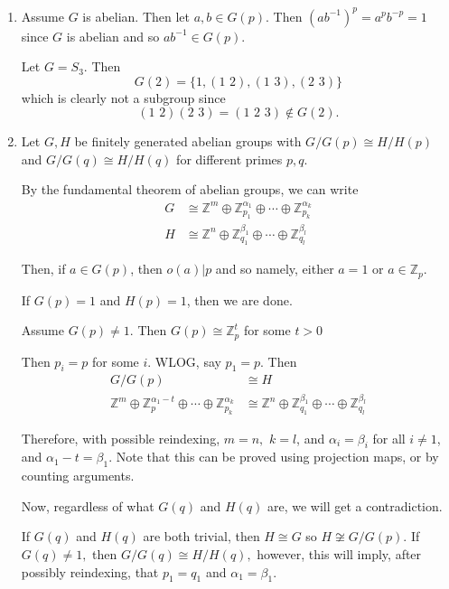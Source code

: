 \documentclass[12pt]{Qual}
\begin{document}
\begin{solution}$\,$
\begin{enumerate}[label=(\alph*)]
    \item Assume $G$ is abelian. Then let $a,b\in G(p)$. Then $(ab^{-1})^p=a^pb^{-p}=1$ since $G$ is abelian and so $ab^{-1}\in G(p).$

    Let $G=S_3$. Then $$G(2)=\{1,(1\,\, 2),(1\,\, 3),(2\,\,3)\}$$ which is clearly not a subgroup since $$(1\,\, 2)(2\,\,3)=(1\,\,2\,\,3)\notin G(2).$$
    \item Let $G,H$ be finitely generated abelian groups with $G/G(p)\cong H/H(p)$ and $G/G(q)\cong H/H(q)$ for different primes $p,q$.

    By the fundamental theorem of abelian groups, we can write \begin{align*}
        G&\cong\mathbb{Z}^m\oplus\mathbb{Z}_{p_1}^{\alpha_1}\oplus\cdots\oplus\mathbb{Z}_{p_k}^{\alpha_k}\\
        H&\cong\mathbb{Z}^n\oplus\mathbb{Z}_{q_1}^{\beta_1}\oplus\cdots\oplus\mathbb{Z}_{q_l}^{\beta_l}
    \end{align*}

    Then, if $a\in G(p)$, then $o(a)|p$ and so namely, either $a=1$ or $a\in\mathbb{Z}_p$.

    If $G(p)=1$ and $H(p)=1$, then we are done.

    Assume $G(p)\not=1.$ Then $G(p)\cong\mathbb{Z}_p^t$ for some $t>0$

     Then $p_i=p$ for some $i$. WLOG, say $p_1=p.$ Then \begin{align*}
        G/G(p)&\cong H\\
        \mathbb{Z}^m\oplus\mathbb{Z}_{p}^{\alpha_1-t}\oplus\cdots\oplus\mathbb{Z}_{p_k}^{\alpha_k}&\cong \mathbb{Z}^n\oplus\mathbb{Z}_{q_1}^{\beta_1}\oplus\cdots\oplus\mathbb{Z}_{q_l}^{\beta_l}
    \end{align*}

    Therefore, with possible reindexing, $m=n,$ $k=l$, and $\alpha_i=\beta_i$ for all $i\not=1$, and $\alpha_1-t=\beta_1.$ Note that this can be proved using projection maps, or by counting arguments.

    Now, regardless of what $G(q)$ and $H(q)$ are, we will get a contradiction.

    If $G(q)$ and $H(q)$ are both trivial, then $H\cong G$ so $H\not\cong G/G(p).$ If $G(q)\not=1,$ then $G/G(q)\cong H/H(q),$ however, this will imply, after possibly reindexing, that $p_1=q_1$ and $\alpha_1=\beta_1.$


\end{enumerate}
\end{solution}
\end{document}
